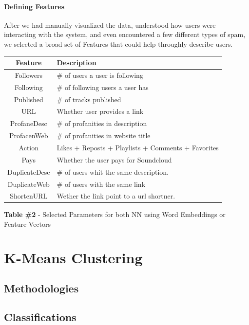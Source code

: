 \documentclass[11pt,twocolumn]{article} %
\begin{document}
\paragraph{Defining Features}
After we had manually visualized the data, understood how users were interacting with the system, and even encountered a few different types of spam, we selected a broad set of Features that could help throughly describe users.

\begin{center}
	\begin{tabular}{ | c | l |}
		\hline
		Feature & Description \\
		\hline
		Followers & \# of users a user is following \\
		Following & \# of following users a user has  \\
		Published & \# of tracks published \\
		URL & Whether user provides a link \\
		ProfaneDesc & \# of profanities in description \\
		ProfacenWeb & \# of profanities in website title \\
		Action & Likes + Reposts + Playlists
		 + Comments + Favorites \\
		Pays & Whether the user pays for Soundcloud \\
		DuplicateDesc & \# of users whit the same description.\\
		DuplicateWeb & \# of users with the same link \\
		ShortenURL & Wether the link point to a url shortner. \\
		\hline
	\end{tabular}
	\newline
	\newline
	\textbf{Table \#2 } - Selected Parameters for both NN using Word Embeddings or Feature Vectors
\end{center}


\section{K-Means Clustering}
\subsection{Methodologies}
\subsection{Classifications}
\end{document}
